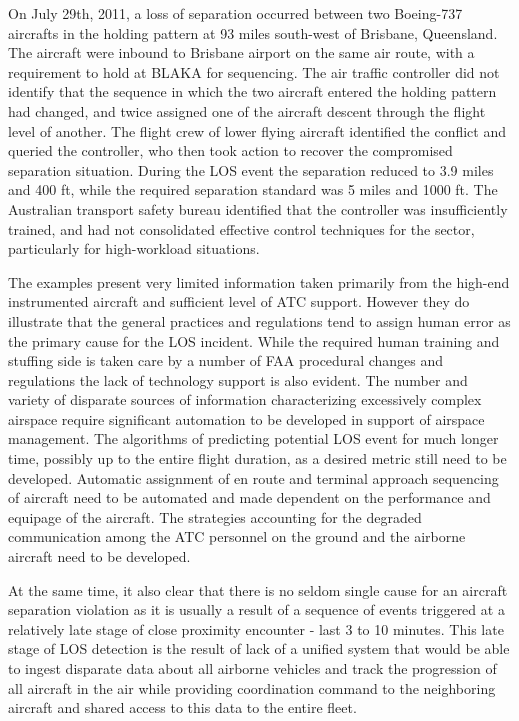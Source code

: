 \documentclass[letter,onecolumn,12pt]{aiaa-tc}
\newcommand{\1}{1_n}
\begin{document}
On July 29th, 2011, a loss of separation occurred between two Boeing-737 aircrafts in the holding pattern at 93 miles south-west of Brisbane, Queensland\cite{Brisbane_ATSR2011}. The aircraft were inbound to Brisbane airport on the same air route, with a requirement to hold at BLAKA for sequencing. The air traffic controller did not identify that the sequence in which the two aircraft entered the holding pattern had changed, and twice assigned one of the aircraft descent through the flight level of another. The flight crew of lower flying aircraft identified the conflict and queried the controller, who then took action to recover the compromised separation situation. During the LOS event the separation reduced to 3.9 miles and 400 ft, while the required separation standard was 5 miles and 1000 ft. The Australian transport safety bureau identified that the controller was insufficiently trained, and had not consolidated effective control techniques for the sector, particularly for high-workload situations. 

The examples present very limited information taken primarily from the high-end instrumented aircraft and sufficient level of ATC support. However they do illustrate that the general practices and regulations tend to assign human error as the primary cause for the LOS incident. While the required human training and stuffing side is taken care by a number of FAA procedural changes and regulations\cite{OIG_AR2013} the lack of technology support is also evident. The number and variety of disparate sources of information characterizing excessively complex airspace require significant automation to be developed in support of airspace management. The algorithms of predicting potential LOS event for much longer time, possibly up to the entire flight duration, as a desired metric still need to be developed. Automatic assignment of en route and terminal approach sequencing of aircraft need to be automated and made dependent on the performance and equipage of the aircraft. The strategies accounting for the degraded communication among the ATC personnel on the ground and the airborne aircraft need to be developed.

At the same time, it also clear that there is no seldom single cause for an aircraft separation violation as it is usually a result of  a sequence of events triggered at a relatively late stage of close proximity encounter - last 3 to 10 minutes. This late stage of LOS detection is the result of lack of a unified system that would be able to ingest disparate data about all airborne vehicles and track the progression of all aircraft in the air while providing coordination command to the neighboring aircraft and shared access to this data to the entire fleet.
\end{document}
